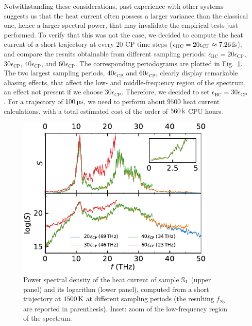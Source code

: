 Notwithstanding these considerations, past experience with other systems suggests us that the \abinitio heat current often possess a larger variance than the classical one,  hence a larger spectral power, that may invalidate the empirical tests just performed. 
To verify that this was not the case, we decided to compute the \abinitio heat current of a short trajectory at every $20$ CP time steps ($\epsilon_\mathrm{HC} = 20 \epsilon_\mathrm{CP} \approx 7.26\,\mathrm{fs}$), and compare the results obtainable from different sampling periods: $\epsilon_\mathrm{HC} = 20\epsilon_\mathrm{CP}$, $30\epsilon_\mathrm{CP}$, $40\epsilon_\mathrm{CP}$, and $60\epsilon_\mathrm{CP}$. 
The corresponding periodograms are plotted in Fig.~\ref{fig:results-quantum-dt-choice}. The two largest sampling periods, $40\epsilon_\mathrm{CP}$ and $60\epsilon_\mathrm{CP}$, clearly display remarkable aliasing effects, that affect the low- and middle-frequency region of the spectrum, an effect not present if we choose $30\epsilon_\mathrm{CP}$. 
Therefore, we decided to set $\epsilon_\mathrm{HC} = 30\epsilon_\mathrm{CP}$. For a trajectory of $100\,\mathrm{ps}$, we need to perform about $9500$ heat current calculations, with a total estimated cost of the order of $560\,\mathrm{k}$ CPU hours. 

\begin{figure}[!tb]
    \centering
    \includegraphics[width=10cm]{chapters/chapter6/figures/qsilica_432_1500K_dt_choice.pdf}
    \caption{Power spectral density of the \abinitio heat current of sample $\S1$ (upper panel) and its logarithm (lower panel), computed from a short trajectory at $1500\,\mathrm{K}$ at different sampling periods (the resulting $f_\mathrm{Ny}$ are reported in parenthesis). Inset: zoom of the low-frequency region of the spectrum.}
    \label{fig:results-quantum-dt-choice}
\end{figure}


